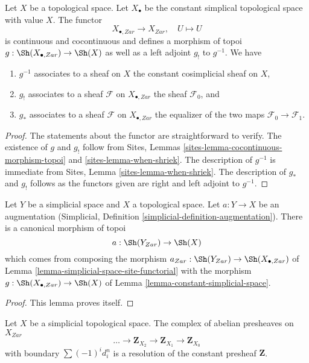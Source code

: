 \begin{lemma}
\label{lemma-constant-simplicial-space}
Let $X$ be a topological space. Let $X_\bullet$ be the constant
simplical topological space with value $X$. The functor
$$
X_{\bullet, Zar} \longrightarrow X_{Zar},\quad
U \longmapsto U
$$
is continuous and cocontinuous and defines a morphism of
topoi $g : \Sh(X_{\bullet, Zar}) \to \Sh(X)$ as well as a left adjoint
$g_!$ to $g^{-1}$. We have
\begin{enumerate}
\item $g^{-1}$ associates to a sheaf on $X$ the constant cosimplicial
sheaf on $X$,
\item $g_!$ associates to a sheaf $\mathcal{F}$ on $X_{\bullet, Zar}$ the
sheaf $\mathcal{F}_0$, and
\item $g_*$ associates to a sheaf $\mathcal{F}$ on $X_{\bullet, Zar}$ the
equalizer of the two maps $\mathcal{F}_0 \to \mathcal{F}_1$.
\end{enumerate}
\end{lemma}

\begin{proof}
The statements about the functor are straightforward to verify.
The existence of $g$ and $g_!$ follow from
Sites, Lemmas \ref{sites-lemma-cocontinuous-morphism-topoi} and
\ref{sites-lemma-when-shriek}. The description of
$g^{-1}$ is immediate from Sites, Lemma \ref{sites-lemma-when-shriek}.
The description of $g_*$ and $g_!$ follows as the functors given are
right and left adjoint to $g^{-1}$.
\end{proof}

\begin{lemma}
\label{lemma-augmentation}
Let $Y$ be a simplicial space and $X$ a topological space.
Let $a : Y \to X$ be an augmentation
(Simplicial, Definition \ref{simplicial-definition-augmentation}).
There is a canonical morphism of topoi
$$
a : \Sh(Y_{Zar}) \to \Sh(X)
$$
which comes from composing the morphism
$a_{Zar} : \Sh(Y_{Zar}) \to \Sh(X_{\bullet, Zar})$ of
Lemma \ref{lemma-simplicial-space-site-functorial}
with the morphism $g : \Sh(X_{\bullet, Zar}) \to \Sh(X)$ of
Lemma \ref{lemma-constant-simplicial-space}.
\end{lemma}

\begin{proof}
This lemma proves itself.
\end{proof}

\begin{lemma}
\label{lemma-simplicial-resolution-Z}
Let $X$ be a simplicial topological space. The complex of
abelian presheaves on $X_{Zar}$
$$
\ldots \to \mathbf{Z}_{X_2} \to \mathbf{Z}_{X_1} \to \mathbf{Z}_{X_0}
$$
with boundary $\sum (-1)^i d^n_i$ is a resolution
of the constant presheaf $\mathbf{Z}$.
\end{lemma}

